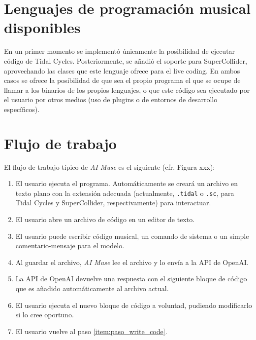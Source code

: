 
\section{Lenguajes de programación musical disponibles}

En un primer momento se implementó únicamente la posibilidad de ejecutar código de Tidal Cycles. Posteriormente, se añadió el soporte para SuperCollider, aprovechando las clases que este lenguaje ofrece para el live coding. En ambos casos se ofrece la posibilidad de que sea el propio programa el que se ocupe de llamar a los binarios de los propios lenguajes, o que este código sea ejecutado por el usuario por otros medios (uso de plugins o de entornos de desarrollo específicos).


\section{Flujo de trabajo}

El flujo de trabajo típico de \emph{AI Muse} es el siguiente (cfr. Figura xxx):

\begin{enumerate}
    \item El usuario ejecuta el programa. Automáticamente se creará un archivo en texto plano con la extensión adecuada (actualmente, \texttt{.tidal} o \texttt{.sc}, para Tidal Cycles y SuperCollider, respectivamente) para interactuar.
    \item El usuario abre un archivo de código en un editor de texto.
    \item \label{item:paso_write_code} El usuario puede escribir código musical, un comando de sistema o un simple comentario-mensaje para el modelo.
    \item Al guardar el archivo, \emph{AI Muse} lee el archivo y lo envía a la API de OpenAI.
    \item La API de OpenAI devuelve una respuesta con el siguiente bloque de código que es añadido automáticamente al archivo actual.
    \item El usuario ejecuta el nuevo bloque de código a voluntad, pudiendo modificarlo si lo cree oportuno.
    \item El usuario vuelve al paso \ref{item:paso_write_code}.
\end{enumerate}


